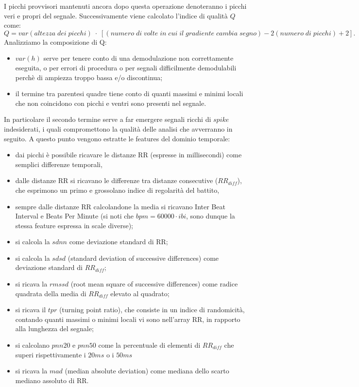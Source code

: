\documentclass[12pt,a4paper, twoside, openright]{report}
\begin{document}
I picchi provvisori mantenuti ancora dopo questa operazione denoteranno i picchi veri e propri del segnale.
Successivamente viene calcolato l'indice di qualità $Q$ come:
\begin{equation}
	Q = var(altezza\;dei\;picchi)\;\cdot\;[(numero\;di\;volte\;in\;cui\;il\;gradiente			\;cambia\;segno) - 2(numero\;di\;picchi) +2].
\end{equation}
Analizziamo la composizione di Q:\begin{itemize}
	\item $var(h)$ serve per tenere conto di una demodulazione non correttamente 					  eseguita, o per errori di procedura o per segnali difficilmente demodulabili 				  perchè di ampiezza troppo bassa e/o discontinua;
	\item il termine tra parentesi quadre tiene conto di quanti massimi e minimi locali 		  che non coincidono con picchi e ventri sono presenti nel segnale. 
\end{itemize}
In particolare il secondo termine serve a far emergere segnali ricchi di $spike$ indesiderati, i quali compromettono la qualità delle analisi che avverranno in seguito.
A questo punto vengono estratte le features del dominio temporale:\begin{itemize}
	\item dai picchi è possibile ricavare le distanze RR (espresse in millisecondi) 				  come semplici differenze temporali,
	\item dalle distanze RR si ricavano le differenze tra distanze consecutive 						  ($RR_{diff}$), che esprimono un primo e grossolano indice di regolarità del 				  battito,
	\item sempre dalle distanze RR calcolandone la media si ricavano Inter Beat 					  Interval e Beats Per Minute (si noti che $bpm = 60000\cdot ibi$, sono dunque 				  la stessa feature espressa in scale diverse);
	\item si calcola la $sdnn$ come deviazione standard di RR;
	\item si calcola la $sdsd$ (standard deviation of successive differences) come 					  deviazione standard di $RR_{diff}$;
	\item si ricava la $rmssd$ (root mean square of successive differences) come 					  radice quadrata della media di $RR_{diff}$ elevato al quadrato;
	\item si ricava il $tpr$ (turning point ratio), che consiste in un indice di 					  randomicità, contando quanti massimi o minimi locali vi sono nell'array RR, 				  in rapporto alla lunghezza del segnale;
	\item si calcolano $pnn20$ e $pnn50$ come la percentuale di elementi di 				  	  	  $RR_{diff}$ che superi rispettivamente i $20ms$ o i $50ms$
	\item si ricava la $mad$ (median absolute deviation) come mediana dello scarto 					  mediano assoluto di RR.
\end{itemize}
\end{document}
